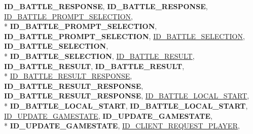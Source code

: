 \begin{DoxyCompactItemize}
{\bfseries I\-D\-\_\-\-B\-A\-T\-T\-L\-E\-\_\-\-R\-E\-S\-P\-O\-N\-S\-E}, 
{\bfseries I\-D\-\_\-\-B\-A\-T\-T\-L\-E\-\_\-\-R\-E\-S\-P\-O\-N\-S\-E}, 
\hyperlink{namespace_champ_net_plugin_a2ade5cfa7cf6c25ab7236c6b54a57821a1ce06c939b64517c251a1cc36168837f}{I\-D\-\_\-\-B\-A\-T\-T\-L\-E\-\_\-\-P\-R\-O\-M\-P\-T\-\_\-\-S\-E\-L\-E\-C\-T\-I\-O\-N}, 
\\*
{\bfseries I\-D\-\_\-\-B\-A\-T\-T\-L\-E\-\_\-\-P\-R\-O\-M\-P\-T\-\_\-\-S\-E\-L\-E\-C\-T\-I\-O\-N}, 
{\bfseries I\-D\-\_\-\-B\-A\-T\-T\-L\-E\-\_\-\-P\-R\-O\-M\-P\-T\-\_\-\-S\-E\-L\-E\-C\-T\-I\-O\-N}, 
\hyperlink{namespace_champ_net_plugin_a2ade5cfa7cf6c25ab7236c6b54a57821aaf35bd9b65c9b7d548147fbd85717bf9}{I\-D\-\_\-\-B\-A\-T\-T\-L\-E\-\_\-\-S\-E\-L\-E\-C\-T\-I\-O\-N}, 
{\bfseries I\-D\-\_\-\-B\-A\-T\-T\-L\-E\-\_\-\-S\-E\-L\-E\-C\-T\-I\-O\-N}, 
\\*
{\bfseries I\-D\-\_\-\-B\-A\-T\-T\-L\-E\-\_\-\-S\-E\-L\-E\-C\-T\-I\-O\-N}, 
\hyperlink{namespace_champ_net_plugin_a2ade5cfa7cf6c25ab7236c6b54a57821a744cf8458d36d27da738fcf6ba76001c}{I\-D\-\_\-\-B\-A\-T\-T\-L\-E\-\_\-\-R\-E\-S\-U\-L\-T}, 
{\bfseries I\-D\-\_\-\-B\-A\-T\-T\-L\-E\-\_\-\-R\-E\-S\-U\-L\-T}, 
{\bfseries I\-D\-\_\-\-B\-A\-T\-T\-L\-E\-\_\-\-R\-E\-S\-U\-L\-T}, 
\\*
\hyperlink{namespace_champ_net_plugin_a2ade5cfa7cf6c25ab7236c6b54a57821a0400430dae2bfdb56c3c5be84d5fc2b1}{I\-D\-\_\-\-B\-A\-T\-T\-L\-E\-\_\-\-R\-E\-S\-U\-L\-T\-\_\-\-R\-E\-S\-P\-O\-N\-S\-E}, 
{\bfseries I\-D\-\_\-\-B\-A\-T\-T\-L\-E\-\_\-\-R\-E\-S\-U\-L\-T\-\_\-\-R\-E\-S\-P\-O\-N\-S\-E}, 
{\bfseries I\-D\-\_\-\-B\-A\-T\-T\-L\-E\-\_\-\-R\-E\-S\-U\-L\-T\-\_\-\-R\-E\-S\-P\-O\-N\-S\-E}, 
\hyperlink{namespace_champ_net_plugin_a2ade5cfa7cf6c25ab7236c6b54a57821ab54454887b51006a69a632ca6a13aab6}{I\-D\-\_\-\-B\-A\-T\-T\-L\-E\-\_\-\-L\-O\-C\-A\-L\-\_\-\-S\-T\-A\-R\-T}, 
\\*
{\bfseries I\-D\-\_\-\-B\-A\-T\-T\-L\-E\-\_\-\-L\-O\-C\-A\-L\-\_\-\-S\-T\-A\-R\-T}, 
{\bfseries I\-D\-\_\-\-B\-A\-T\-T\-L\-E\-\_\-\-L\-O\-C\-A\-L\-\_\-\-S\-T\-A\-R\-T}, 
\hyperlink{namespace_champ_net_plugin_a2ade5cfa7cf6c25ab7236c6b54a57821a6c390584862af2434c946e375365fe02}{I\-D\-\_\-\-U\-P\-D\-A\-T\-E\-\_\-\-G\-A\-M\-E\-S\-T\-A\-T\-E}, 
{\bfseries I\-D\-\_\-\-U\-P\-D\-A\-T\-E\-\_\-\-G\-A\-M\-E\-S\-T\-A\-T\-E}, 
\\*
{\bfseries I\-D\-\_\-\-U\-P\-D\-A\-T\-E\-\_\-\-G\-A\-M\-E\-S\-T\-A\-T\-E}, 
\hyperlink{namespace_champ_net_plugin_a2ade5cfa7cf6c25ab7236c6b54a57821a95ea635e1f4775e77d635b7039a9711e}{I\-D\-\_\-\-C\-L\-I\-E\-N\-T\-\_\-\-R\-E\-Q\-U\-E\-S\-T\-\_\-\-P\-L\-A\-Y\-E\-R}, 

\end{DoxyCompactItemize}
